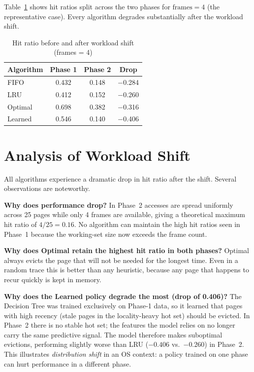 \documentclass[12pt,a4paper]{article}
\begin{document}
Table~\ref{tab:phase} shows hit ratios split across the two phases for
$\text{frames}=4$ (the representative case). Every algorithm degrades
substantially after the workload shift.

\begin{table}[h]
\centering
\caption{Hit ratio before and after workload shift (frames = 4)}
\label{tab:phase}
\begin{tabular}{lccc}
\toprule
Algorithm & Phase 1 & Phase 2 & Drop \\
\midrule
FIFO    & 0.432 & 0.148 & $-$0.284 \\
LRU     & 0.412 & 0.152 & $-$0.260 \\
Optimal & 0.698 & 0.382 & $-$0.316 \\
Learned & 0.546 & 0.140 & $-$0.406 \\
\bottomrule
\end{tabular}
\end{table}

\section{Analysis of Workload Shift}

All algorithms experience a dramatic drop in hit ratio after the shift.
Several observations are noteworthy.

\textbf{Why does performance drop?} In Phase~2 accesses are spread uniformly
across 25 pages while only 4 frames are available, giving a theoretical maximum
hit ratio of $4/25 = 0.16$. No algorithm can maintain the high hit ratios seen
in Phase~1 because the working-set size now exceeds the frame count.

\textbf{Why does Optimal retain the highest hit ratio in both phases?}
Optimal always evicts the page that will not be needed for the longest time.
Even in a random trace this is better than any heuristic, because any page
that happens to recur quickly is kept in memory.

\textbf{Why does the Learned policy degrade the most (drop of 0.406)?}
The Decision Tree was trained exclusively on Phase-1 data, so it learned that
pages with high recency (stale pages in the locality-heavy hot set) should be
evicted. In Phase~2 there is no stable hot set; the features the model relies
on no longer carry the same predictive signal. The model therefore makes
suboptimal evictions, performing slightly worse than LRU ($-0.406$ vs.\
$-0.260$) in Phase~2. This illustrates \emph{distribution shift} in an OS
context: a policy trained on one phase can hurt performance in a different phase.
\end{document}
